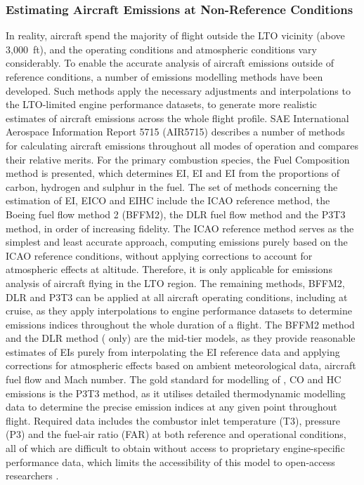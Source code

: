 \subsubsection{Estimating Aircraft Emissions at Non-Reference Conditions}
In reality, aircraft spend the majority of flight outside the LTO vicinity (above 3,000~ft), and the operating conditions and atmospheric conditions vary considerably. To enable the accurate analysis of aircraft emissions outside of reference conditions, a number of emissions modelling methods have been developed. Such methods apply the necessary adjustments and interpolations to the LTO-limited engine performance datasets, to generate more realistic estimates of aircraft emissions across the whole flight profile. SAE International Aerospace Information Report 5715 (AIR5715) \cite{AIR5715} describes a number of methods for calculating aircraft emissions throughout all modes of operation and compares their relative merits. For the primary combustion species, the Fuel Composition method is presented, which determines EI, EI and EI from the proportions of carbon, hydrogen and sulphur in the fuel. The set of methods concerning the estimation of EI, EICO and EIHC include the ICAO reference method, the Boeing fuel flow method 2 (BFFM2), the DLR fuel flow method and the P3T3 method, in order of increasing fidelity. The ICAO reference method serves as the simplest and least accurate approach, computing emissions purely based on the ICAO reference conditions, without applying corrections to account for atmospheric effects at altitude. Therefore, it is only applicable for emissions analysis of aircraft flying in the LTO region.  The remaining methods, BFFM2, DLR and P3T3 can be applied at all aircraft operating conditions, including at cruise, as they apply interpolations to engine performance datasets to determine emissions indices throughout the whole duration of a flight. The BFFM2 method and the DLR method ( only) are the mid-tier models, as they provide reasonable estimates of EIs purely from interpolating the EI reference data and applying corrections for atmospheric effects based on ambient meteorological data, aircraft fuel flow and Mach number. The gold standard for modelling of , CO and HC emissions is the P3T3 method, as it utilises detailed thermodynamic modelling data to determine the precise emission indices at any given point throughout flight. Required data includes the combustor inlet temperature (T3), pressure (P3) and the fuel-air ratio (FAR) at both reference and operational conditions, all of which are difficult to obtain without access to proprietary engine-specific performance data, which limits the accessibility of this model to open-access researchers \cite{Brink2020, DuBois2006}.

